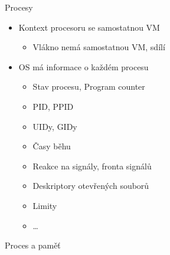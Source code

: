 
\begin{frame}{Procesy}

  \begin{itemize}
    \item Kontext procesoru se samostatnou VM
    \begin{itemize}
      \item Vlákno nemá samostatnou VM, sdílí
    \end{itemize}

    \pause

    \item OS má informace o každém procesu
    \begin{itemize}
      \item Stav procesu, Program counter
      \item PID, PPID
      \item UIDy, GIDy
      \item Časy běhu
      \item Reakce na signály, fronta signálů
      \item Deskriptory otevřených souborů
      \item Limity
      \item \dots
    \end{itemize}
  \end{itemize}

\end{frame}

\begin{frame}{Proces a paměť}

  \begin{center}
    
  \end{center}

\end{frame}

